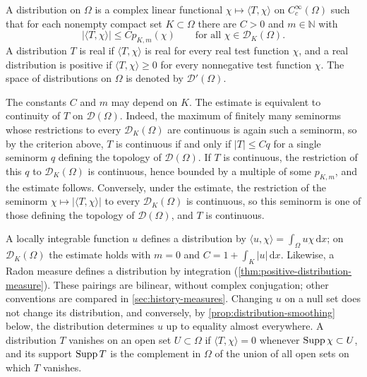 \begin{definition}\label{def:distribution}
A distribution on $\Omega$ is a complex linear functional $\chi\mapsto\langle T,\chi\rangle$ on $C_c^\infty(\Omega)$ such that for each nonempty compact set $K\subset\Omega$ there are $C>0$ and $m\in\mathbb N$ with
\[
 |\langle T,\chi\rangle|\leq C p_{K,m}(\chi)\qquad\text{for all }\chi\in\mathcal D_K(\Omega).
\]
A distribution $T$ is real if $\langle T,\chi\rangle$ is real for every real test function $\chi$, and a real distribution is positive if $\langle T,\chi\rangle\geq0$ for every nonnegative test function $\chi$. The space of distributions on $\Omega$ is denoted by $\mathcal D'(\Omega)$.
\end{definition}
The constants $C$ and $m$ may depend on $K$. The estimate is equivalent to continuity of $T$ on $\mathcal D(\Omega)$. Indeed, the maximum of finitely many seminorms whose restrictions to every $\mathcal D_K(\Omega)$ are continuous is again such a seminorm, so by the criterion above, $T$ is continuous if and only if $|T|\leq Cq$ for a single seminorm $q$ defining the topology of $\mathcal D(\Omega)$. If $T$ is continuous, the restriction of this $q$ to $\mathcal D_K(\Omega)$ is continuous, hence bounded by a multiple of some $p_{K,m}$, and the estimate follows. Conversely, under the estimate, the restriction of the seminorm $\chi\mapsto|\langle T,\chi\rangle|$ to every $\mathcal D_K(\Omega)$ is continuous, so this seminorm is one of those defining the topology of $\mathcal D(\Omega)$, and $T$ is continuous.

A locally integrable function $u$ defines a distribution by $\langle u,\chi\rangle=\int_\Omega u\chi\,\mathrm d x$; on $\mathcal D_K(\Omega)$ the estimate holds with $m=0$ and $C=1+\int_K|u|\,\mathrm d x$. Likewise, a Radon measure defines a distribution by integration (\cref{thm:positive-distribution-measure}). These pairings are bilinear, without complex conjugation; other conventions are compared in \cref{sec:history-measures}. Changing $u$ on a null set does not change its distribution, and conversely, by \cref{prop:distribution-smoothing} below, the distribution determines $u$ up to equality almost everywhere. A distribution $T$ vanishes on an open set $U\subset\Omega$ if $\langle T,\chi\rangle=0$ whenever $\operatorname{Supp}\chi\subset U$, and its support $\operatorname{Supp} T$ is the complement in $\Omega$ of the union of all open sets on which $T$ vanishes.


